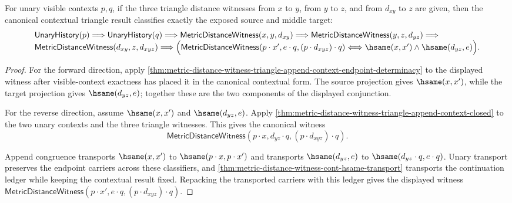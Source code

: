 \begin{theorem}
\label{thm:metric-distance-witness-triangle-append-context-endpoint-iff}
For unary visible contexts $p,q$, if the three triangle distance witnesses
from $x$ to $y$, from $y$ to $z$, and from $d_{xy}$ to $z$ are given, then
the canonical contextual triangle result classifies exactly the exposed source
and middle target:
$$
\begin{array}{l}
\mathsf{UnaryHistory}(p)\Longrightarrow
\mathsf{UnaryHistory}(q)\Longrightarrow
\mathsf{MetricDistanceWitness}(x,y,d_{xy})\Longrightarrow
\mathsf{MetricDistanceWitness}(y,z,d_{yz})\Longrightarrow
\\
\mathsf{MetricDistanceWitness}(d_{xy},z,d_{xyz})\Longrightarrow
\Bigl(
\mathsf{MetricDistanceWitness}(p\cdot x',e\cdot q,(p\cdot d_{xyz})\cdot q)
\Longleftrightarrow
\hsame(x,x')\land\hsame(d_{yz},e)
\Bigr).
\end{array}
$$
\end{theorem}
\begin{proof}
For the forward direction, apply
\autoref{thm:metric-distance-witness-triangle-append-context-endpoint-determinacy}
to the displayed witness after visible-context exactness has placed it in the
canonical contextual form. The source projection gives $\hsame(x,x')$, while
the target projection gives $\hsame(d_{yz},e)$; together these are the two
components of the displayed conjunction.

For the reverse direction, assume $\hsame(x,x')$ and $\hsame(d_{yz},e)$.
Apply \autoref{thm:metric-distance-witness-triangle-append-context-closed} to
the two unary contexts and the three triangle witnesses. This gives the
canonical witness
$$
\mathsf{MetricDistanceWitness}(p\cdot x,d_{yz}\cdot q,(p\cdot d_{xyz})\cdot q).
$$

Append congruence transports $\hsame(x,x')$ to
$\hsame(p\cdot x,p\cdot x')$ and transports $\hsame(d_{yz},e)$ to
$\hsame(d_{yz}\cdot q,e\cdot q)$. Unary transport preserves the endpoint
carriers across these classifiers, and
\autoref{thm:metric-distance-witness-cont-hsame-transport} transports the
continuation ledger while keeping the contextual result fixed. Repacking the
transported carriers with this ledger gives the displayed witness
$\mathsf{MetricDistanceWitness}(p\cdot x',e\cdot q,(p\cdot d_{xyz})\cdot q)$.
\end{proof}
